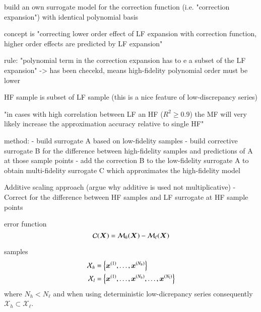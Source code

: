 build an own surrogate model for the correction function (i.e. "correction expansion") with identical polynomial basis

concept is "correcting lower order effect of LF expansion with correction function, higher order effects are predicted by LF expansion" \cite{palar_multi-fidelity_2016}

rule: "polynomial term in the correction expansion has to e a subset of the LF expansion" \cite{palar_multi-fidelity_2016}
-> has been checekd, means high-fidelity polynomial order must be lower 

HF sample is subset of LF sample (this is a nice feature of low-discrepancy series)

"in cases with high correlation between LF an HF ($R^2 \geq 0.9$) the MF will very likely increase the approximation accuracy relative to single HF" \cite{palar_multi-fidelity_2016}

method:
- build surrogate A based on low-fidelity samples
- build corrective surrogate B for the difference between high-fidelity samples and predictions of A at those sample points
- add the correction B to the low-fidelity surrogate A to obtain multi-fidelity surrogate C which approximates the high-fidelity model

Additive scaling approach (argue why additive is used not multiplicative)
- Correct for the difference between HF samples and LF surrogate at HF sample points

error function
\begin{equation}
    \mathcal{C}(\bm X) = \mathcal{M}_h(\bm X) - \mathcal{M}_\ell(\bm X)
\end{equation}

samples
\begin{align}
    \mathcal{X}_h &= \left\{ \bm{x}^{(1)}, \dots, \bm{x}^{(N_h)}\right\} \\
    \mathcal{X}_l &= \left\{ \bm{x}^{(1)}, \dots, \bm{x}^{(N_h)}, \dots, \bm{x}^{(N_l)}\right\}
\end{align}
where $N_h < N_\ell$ and when using deterministic low-dicrepancy series
consequently $\mathcal{X}_h \subset \mathcal{X}_\ell$.

